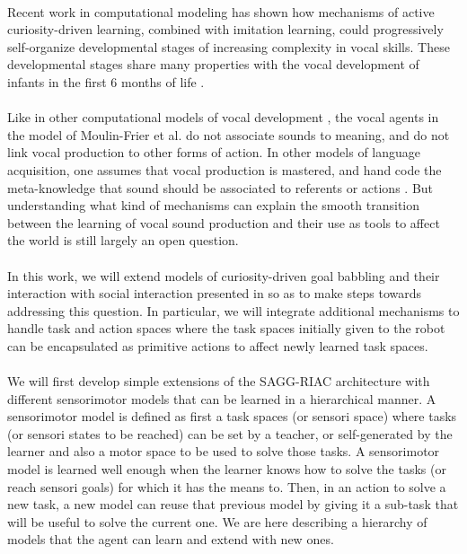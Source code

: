 \documentclass[12pt]{article}
\begin{document}
	\paragraph{}%
	Recent work in computational modeling has shown how mechanisms of active curiosity-driven learning, combined with imitation learning, 
	could progressively self-organize
	developmental stages of increasing complexity in vocal skills.
	These developmental stages share many properties with
	the vocal development of infants in the first 6 months of life \cite{moulin-frier_self-organization_2014}.
	
	\paragraph{}
	Like in other computational models of vocal development \cite{guenther2006neural, howard2011modeling, warlaumont2013prespeech}, 
	the vocal agents in the model of Moulin-Frier et al. do
	not associate sounds to meaning, and do not link vocal production to other forms of action.	
	In other models of language acquisition, one assumes that vocal production is mastered, 
	and	hand code the meta-knowledge that sound should be associated to referents or actions \cite{mangin2012learning}.
	But understanding what kind of mechanisms can explain the smooth transition between the learning of vocal sound
	production and their use as tools to affect the world is still largely an open question.

	\paragraph{}
	In this work, we will extend models of curiosity-driven goal babbling and
	their interaction with social interaction presented in \cite{moulin-frier_self-organization_2014} so as to make
	steps towards addressing this question. 	
	In particular, we will integrate
	additional mechanisms to handle task and action
	spaces where the task spaces initially given to the robot can be encapsulated
	as primitive actions to affect newly learned task spaces.
	
	\paragraph{}	
	We will first develop simple extensions of the SAGG-RIAC architecture with different sensorimotor models that can be learned in a hierarchical manner.	
	A sensorimotor model is defined as first a task spaces (or sensori space) where tasks (or sensori states to be reached) can be set by a teacher, 
	or self-generated by the learner and also a motor space to be used to solve those tasks.	
	A sensorimotor model is learned well enough when the learner knows how to solve the tasks (or reach sensori goals) for which it has the means to.
	Then, in an action to solve a new task, a new model can reuse that previous model by giving it a sub-task that will be useful to solve the current one.
	We are here describing a hierarchy of models that the agent can learn and extend with new ones.
	
\end{document}

